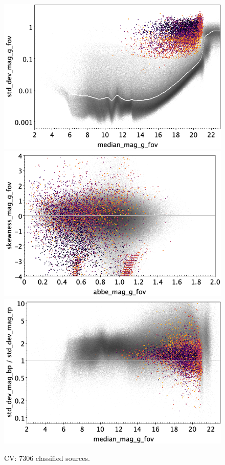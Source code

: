 \documentclass[longauth]{aa}
\begin{document}
\begin{appendix}
\begin{figure}
\hspace{2mm}
 \includegraphics[width=0.45\hsize]{figures/appendix/CV_cls_msd.png} \\ %
\vspace{4mm}
 \includegraphics[width=0.45\hsize]{figures/appendix/CV_cls_ask.png}  %
\hspace{2mm}
 \includegraphics[width=0.45\hsize]{figures/appendix/CV_cls_msdr.png}  \\ %
\vspace{4mm}
 \caption{CV: 7306 classified sources.}  
 \label{fig:app:CV}
\end{figure}


\end{appendix}
\end{document}
